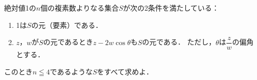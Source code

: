 \documentclass[../../main.tex]{subfiles}
\begin{document}
絶対値1の$n$個の複素数よりなる集合$S$が次の2条件を満たしている：
\begin{enumerate}
  \item 1は$S$の元（要素）である．
  \item $z$，$w$が$S$の元であるとき$z-2w\cos\theta$も$S$の元である．
    ただし，$\theta$は$\displaystyle\dfrac{z}{w}$の偏角とする．
\end{enumerate}
このとき$n\leqq4$であるような$S$をすべて求めよ．
\end{document}
